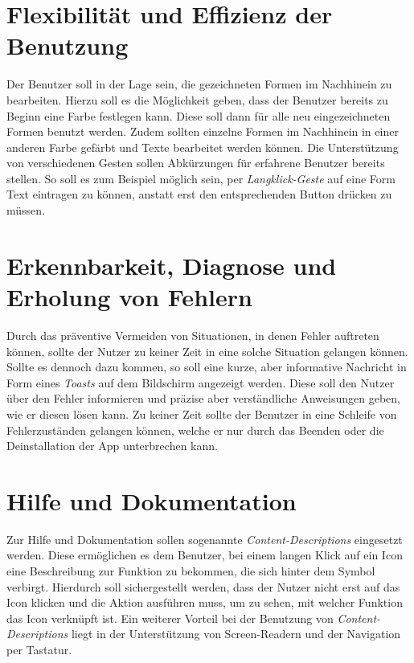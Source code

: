 \section{Flexibilität und Effizienz der Benutzung}
Der Benutzer soll in der Lage sein, die gezeichneten Formen im Nachhinein zu bearbeiten.
Hierzu soll es die Möglichkeit geben, dass der Benutzer bereits zu Beginn eine Farbe festlegen kann.
Diese soll dann für alle neu eingezeichneten Formen benutzt werden.
Zudem sollten einzelne Formen im Nachhinein in einer anderen Farbe gefärbt und Texte bearbeitet werden können.
Die Unterstützung von verschiedenen Gesten sollen Abkürzungen für erfahrene Benutzer bereits stellen.
So soll es zum Beispiel möglich sein, per \emph{Langklick-Geste} auf eine Form Text eintragen zu können, anstatt erst den entsprechenden Button drücken zu müssen.

\section{Erkennbarkeit, Diagnose und Erholung von Fehlern}
Durch das präventive Vermeiden von Situationen, in denen Fehler auftreten können, sollte der Nutzer zu keiner Zeit in eine solche Situation gelangen können.
Sollte es dennoch dazu kommen, so soll eine kurze, aber informative Nachricht in Form eines \emph{Toasts} auf dem Bildschirm angezeigt werden.
Diese soll den Nutzer über den Fehler informieren und präzise aber verständliche Anweisungen geben, wie er diesen lösen kann.
Zu keiner Zeit sollte der Benutzer in eine Schleife von Fehlerzuständen gelangen können, welche er nur durch das Beenden oder die Deinstallation der App unterbrechen kann. 

\section{Hilfe und Dokumentation}
Zur Hilfe und Dokumentation sollen sogenannte \emph{Content-Descriptions} eingesetzt werden.
Diese ermöglichen es dem Benutzer, bei einem langen Klick auf ein Icon eine Beschreibung zur Funktion zu bekommen, die sich hinter dem Symbol verbirgt.
Hierdurch soll sichergestellt werden, dass der Nutzer nicht erst auf das Icon klicken und die Aktion ausführen muss, um zu sehen, mit welcher Funktion das Icon verknüpft ist.
Ein weiterer Vorteil bei der Benutzung von \emph{Content-Descriptions} liegt in der Unterstützung von Screen-Readern und der Navigation per Tastatur.

